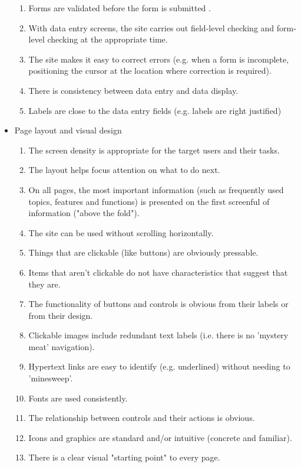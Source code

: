 \begin{itemize}
\begin{enumerate}
        \item Forms are validated before the form is submitted .
        \item With data entry screens, the site carries out field-level checking and form-level checking at the appropriate time.
        \item The site makes it easy to correct errors (e.g. when a form is incomplete, positioning the cursor at the location where correction is required).
        \item There is consistency between data entry and data display.
        \item Labels are close to the data entry fields (e.g. labels are right justified)
      \end{enumerate}
  \item Page layout and visual design
      \begin{enumerate}
        \item The screen density is appropriate for the target users and their tasks.
        \item The layout helps focus attention on what to do next.
        \item On all pages, the most important information (such as frequently used topics, features and functions) is presented on the first screenful of information ("above the fold").
        \item The site can be used without scrolling horizontally.
        \item Things that are clickable (like buttons) are obviously pressable.
        \item Items that aren't clickable do not have characteristics that suggest that they are.
        \item The functionality of buttons and controls is obvious from their labels or from their design.
        \item Clickable images include redundant text labels (i.e. there is no 'mystery meat' navigation).
        \item Hypertext links are easy to identify (e.g. underlined) without needing to 'minesweep'.
        \item Fonts are used consistently.
        \item The relationship between controls and their actions is obvious.
        \item Icons and graphics are standard and/or intuitive (concrete and familiar).
        \item There is a clear visual "starting point" to every page.

\end{enumerate}
\end{itemize}

